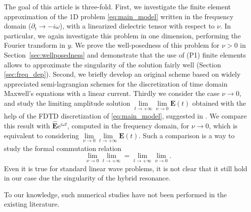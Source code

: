 The goal of this article is three-fold. 
First, we investigate the finite element approximation of the 1D 
problem \eqref{eq:main_model} written in the frequency domain ($\partial_t\rightarrow -i\omega$), with a linearized dielectric tensor with respect to $\nu$.
In particular, we again investigate this problem in one dimension, performing the Fourier transform in $y$.
We prove the well-posedness of this problem for $\nu>0$ in Section~\ref{sec:wellposedness} and 
demonstrate that the use of  (P1) finite elements allows to approximate the singularity 
of the solution fairly well (Section \ref{sec:freq_dep}). 
Second, we briefly develop an original scheme based on widely appreciated semi-lagrangian schemes
for the discretization of time domain Maxwell's equations with a linear current.
Thirdly we consider the case $\nu\rightarrow 0$, and study the limiting amplitude solution 
$\lim\limits_{t\rightarrow +\infty}\lim\limits_{\nu\rightarrow 0}\mathbf{E}(t)$ obtained with the help of 
the FDTD discretization of \eqref{eq:main_model}, suggested in \cite{stable_yee_plasma_current}. 
We compare this result with 
$\hat{\mathbf{E}}\mathrm{e}^{i\omega t}$, computed in the frequency domain, for $\nu\rightarrow 0$, which is equivalent to considering
$\lim\limits_{\nu\rightarrow 0}\lim\limits_{t\rightarrow+\infty}\mathbf{E}(t)$.
Such a comparison is a way to study the formal commutation relation
$$
\lim\limits_{\nu\rightarrow 0}\lim\limits_{t\rightarrow+\infty}= \lim\limits_{t\rightarrow+\infty}\lim\limits_{\nu\rightarrow 0}.
$$
Even it is true for standard linear wave problems, it is not clear that it still hold in our case due the singularity
of the hybrid resonance.
%
%
%

To our knowledge, such numerical studies have not been performed in the existing literature. 

